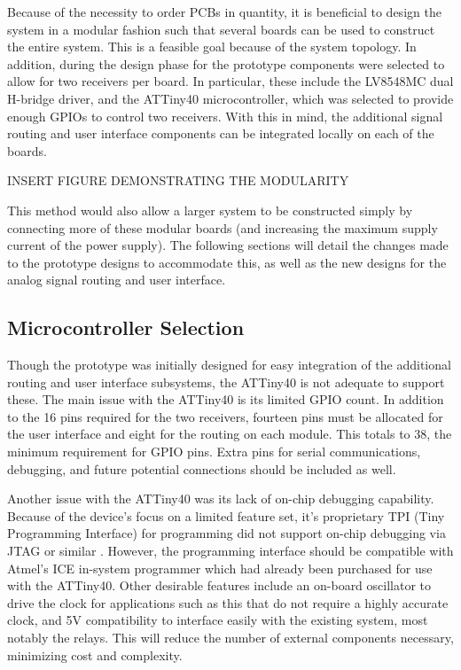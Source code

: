 \documentclass{article}
\begin{document}
	Because of the necessity to order PCBs in quantity, it is beneficial to design the system in a modular fashion such that several boards can be used to construct the entire system.  This is a feasible goal because of the system topology.  In addition, during the design phase for the prototype components were selected to allow for two receivers per board.  In particular, these include the LV8548MC dual H-bridge driver, and the ATTiny40 microcontroller, which was selected to provide enough GPIOs to control two receivers.  With this in mind, the additional signal routing and user interface components can be integrated locally on each of the boards.

	INSERT FIGURE DEMONSTRATING THE MODULARITY

	This method would also allow a larger system to be constructed simply by connecting more of these modular boards (and increasing the maximum supply current of the power supply).  The following sections will detail the changes made to the prototype designs to accommodate this, as well as the new designs for the analog signal routing and user interface.

	\subsection{Microcontroller Selection}

	Though the prototype was initially designed for easy integration of the additional routing and user interface subsystems, the ATTiny40 is not adequate to support these.  The main issue with the ATTiny40 is its limited GPIO count.  In addition to the 16 pins required for the two receivers, fourteen pins must be allocated for the user interface and eight for the routing on each module.  This totals to 38, the minimum requirement for GPIO pins.  Extra pins for serial communications, debugging, and future potential connections should be included as well. 

	Another issue with the ATTiny40 was its lack of on-chip debugging capability.  Because of the device's focus on a limited feature set, it's proprietary TPI (Tiny Programming Interface) for programming did not support on-chip debugging via JTAG or similar \cite{ATTiny40_datasheet}.  However, the programming interface should be compatible with Atmel's ICE in-system programmer which had already been purchased for use with the ATTiny40.  Other desirable features include an on-board oscillator to drive the clock for applications such as this that do not require a highly accurate clock, and 5V compatibility to interface easily with the existing system, most notably the relays.  This will reduce the number of external components necessary, minimizing cost and complexity.
\end{document}
